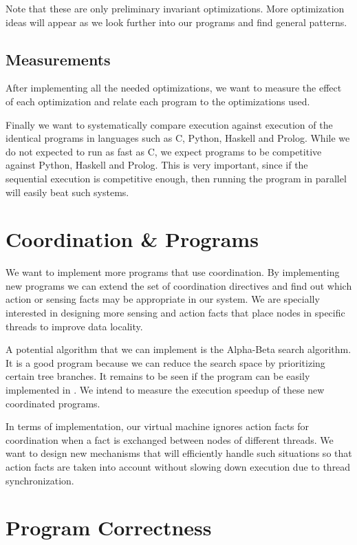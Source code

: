 Note that these are only preliminary invariant optimizations. More optimization ideas will appear
as we look further into our programs and find general patterns.

\subsection{Measurements}

After implementing all the needed optimizations, we want to measure the effect of each optimization
and relate each program to the optimizations used.

Finally we want to systematically compare \lang execution against execution of the identical programs
in languages such as C, Python, Haskell and Prolog. While we do not expected to run as fast as C,
we expect \lang programs to be competitive against Python, Haskell and Prolog. This is very important, since
if the sequential execution is competitive enough, then running the program in parallel will easily
beat such systems.

\section{Coordination \& Programs}

We want to implement more programs that use coordination. By implementing new programs we can
extend the set of coordination directives and find out which action or sensing facts may be
appropriate in our system. We are specially interested in designing more sensing and action
facts that place nodes in specific threads to improve data locality.

A potential algorithm that we can implement is the Alpha-Beta search algorithm. It is a good program
because we can reduce the search space by prioritizing certain tree branches. It remains to be
seen if the program can be easily implemented in \lang.
We intend to measure the execution speedup of these new coordinated programs.

In terms of implementation, our virtual machine ignores action facts for coordination when a fact
is exchanged between nodes of different threads. We want to design new mechanisms
that will efficiently handle such situations so that action facts are taken into account without
slowing down execution due to thread synchronization.

\section{Program Correctness}

